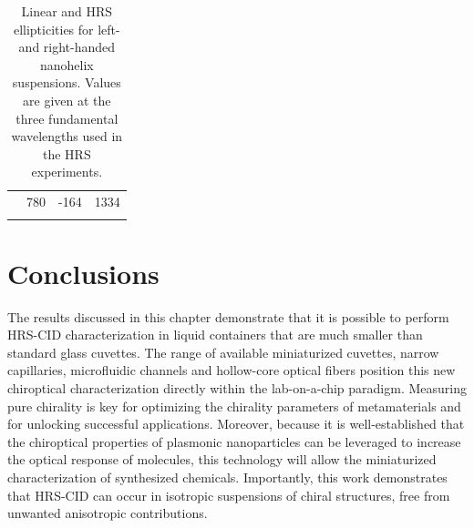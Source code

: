 \begin{table}[tbp]
\begin{tabular}{llll}
                                                                & 780                                                                    & -164                                                                  & 1334                                                               \\ 
    \lasthline
    \end{tabular}
    \caption{Linear and HRS ellipticities for left- and right-handed nanohelix suspensions. Values are given at the three fundamental wavelengths used in the HRS experiments.}
    \label{table:HRS:ellipticity}
\end{table}


\section{Conclusions}
The results discussed in this chapter demonstrate that it is possible to perform HRS-CID characterization in liquid containers that are much smaller than standard glass cuvettes. The range of available miniaturized cuvettes, narrow capillaries, microfluidic channels and hollow-core optical fibers position this new chiroptical characterization directly within the lab-on-a-chip paradigm. Measuring pure chirality is key for optimizing the chirality parameters of metamaterials and for unlocking successful applications. Moreover, because it is well-established that the chiroptical properties of plasmonic nanoparticles can be leveraged to increase the optical response of molecules, this technology will allow the miniaturized characterization of synthesized chemicals. 
Importantly, this work demonstrates that HRS-CID can occur in isotropic suspensions of chiral structures, free from unwanted anisotropic contributions. 